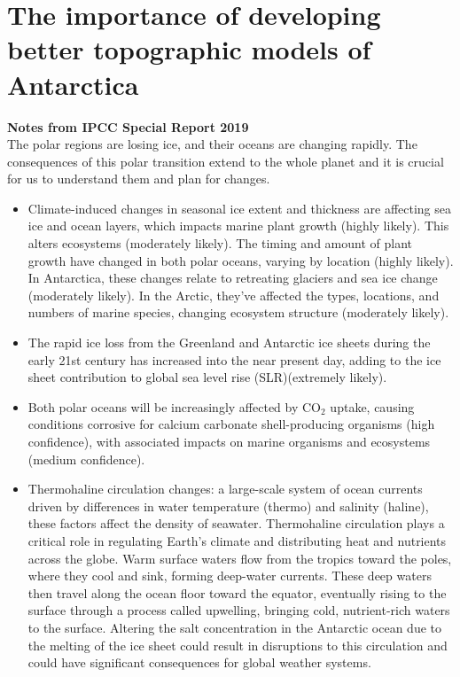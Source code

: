 \chapter{The importance of developing better topographic models of Antarctica}\label{n2}

\textbf{Notes from IPCC Special Report 2019}\\
The polar regions are losing ice, and their oceans are changing rapidly. The consequences of this polar transition extend to the whole planet and it is crucial for us to understand them and plan for changes.
\begin{itemize}
\item Climate-induced changes in seasonal ice extent and thickness are affecting sea ice and ocean layers, which impacts marine plant growth (highly likely). This alters ecosystems (moderately likely). The timing and amount of plant growth have changed in both polar oceans, varying by location (highly likely). In Antarctica, these changes relate to retreating glaciers and sea ice change (moderately likely). In the Arctic, they've affected the types, locations, and numbers of marine species, changing ecosystem structure (moderately likely)\cite{O_C_in_changingClimate}.
\item The rapid ice loss from the Greenland and Antarctic ice sheets during the early 21st century has increased into the near present day, adding to the ice sheet contribution to global sea level rise (SLR)(extremely likely)\cite{O_C_in_changingClimate}.
\item Both polar oceans will be increasingly affected by $\mathrm{CO_2}$ uptake, causing conditions corrosive for calcium carbonate shell-producing organisms (high confidence), with associated impacts on marine organisms and ecosystems (medium confidence)\cite{O_C_in_changingClimate}.
\item Thermohaline circulation changes: a large-scale system of ocean currents driven by differences in water temperature (thermo) and salinity (haline), these factors affect the density of seawater. Thermohaline circulation plays a critical role in regulating Earth's climate and distributing heat and nutrients across the globe. Warm surface waters flow from the tropics toward the poles, where they cool and sink, forming deep-water currents. These deep waters then travel along the ocean floor toward the equator, eventually rising to the surface through a process called upwelling, bringing cold, nutrient-rich waters to the surface\cite{JACOBS_2004}. Altering the salt concentration in the Antarctic ocean due to the melting of the ice sheet could result in disruptions to this circulation and could have significant consequences for global weather systems.

\end{itemize}

